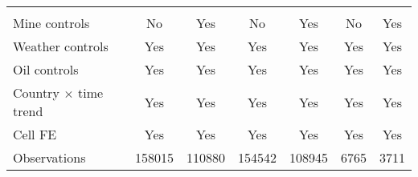 {\begin{tabular}{l*{6}{c}}
\hline \\ Mine controls&          No         &         Yes         &          No         &         Yes         &          No         &         Yes         \\
Weather controls    &         Yes         &         Yes         &         Yes         &         Yes         &         Yes         &         Yes         \\
Oil controls        &         Yes         &         Yes         &         Yes         &         Yes         &         Yes         &         Yes         \\
Country $\times$ time trend&         Yes         &         Yes         &         Yes         &         Yes         &         Yes         &         Yes         \\
Cell FE             &         Yes         &         Yes         &         Yes         &         Yes         &         Yes         &         Yes         \\
Observations        &      158015         &      110880         &      154542         &      108945         &        6765         &        3711         \\
\hline\hline
\end{tabular}
}
